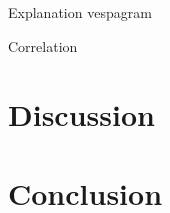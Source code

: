 \documentclass[draft]{agujournal2018}
\begin{document}
Explanation vespagram

Correlation

\section{Discussion}

\section{Conclusion}





%
%
%
%
%
%
%
%
%
%
\end{document}

